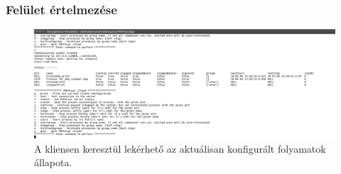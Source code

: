 \documentclass[12pt]{report}
\begin{document}
  \pagebreak

\subsubsection{Felület értelmezése}\label{par:mean}
 \begin{figure}[ht]
  \centering
  \includegraphics[width=15cm]{pics/stat.png}
	  \caption{A kliensen keresztül lekérhető az aktuálisan konfigurált folyamatok állapota.}
      \label{fig:clistat}
  \end{figure}
  
\end{document}
